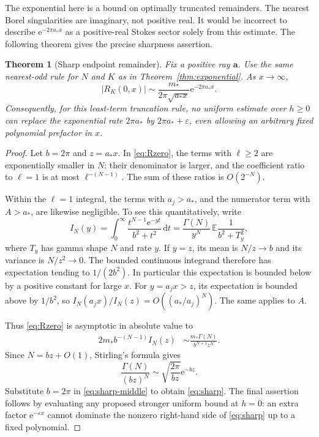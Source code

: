 \documentclass[11pt,a4paper]{article}
\numberwithin{equation}{section}
\newtheorem{theorem}{Theorem}[section]
\theoremstyle{definition}\newtheorem{definition}[theorem]{Definition}
\theoremstyle{remark}\newtheorem{remark}[theorem]{Remark}
\newcommand{\e}{\mathrm e}
\newcommand{\dd}{\,\mathrm d}
\newcommand{\avec}{\boldsymbol a}
\newcommand{\amin}{a_*}
\newcommand{\mmin}{m_*}
\begin{document}
The exponential here is a bound on optimally truncated remainders. The nearest
Borel singularities are imaginary, not positive real. It would be incorrect
to describe $\e^{-2\pi\amin x}$ as a positive-real Stokes sector solely from
this estimate. The following theorem gives the precise sharpness assertion.

\begin{theorem}[Sharp endpoint remainder]
\label{thm:sharp}
Fix a positive ray $\avec$. Use the same nearest-odd rule for $N$ and $K$ as
in Theorem~\ref{thm:exponential}. As $x\to\infty$,
\begin{equation}
 |R_K(0,x)|\sim\frac{\mmin}{2\pi\sqrt{\amin x}}
                         \e^{-2\pi\amin x}.
 \label{eq:sharp}
\end{equation}
Consequently, for this least-term truncation rule, no uniform estimate over
$h\ge0$ can replace the exponential rate $2\pi\amin$ by
$2\pi\amin+\varepsilon$, even allowing an arbitrary fixed polynomial
prefactor in $x$.
\end{theorem}
\begin{proof}
Let $b=2\pi$ and $z=\amin x$. In \eqref{eq:Rzero}, the terms with $\ell\ge2$
are exponentially smaller in $N$: their denominator is larger, and the
coefficient ratio to $\ell=1$ is at most $\ell^{-(N-1)}$. The sum of these
ratios is $O(2^{-N})$.

Within the $\ell=1$ integral, the terms with $a_j>\amin$, and the numerator
term with $A>\amin$, are likewise negligible. To see this quantitatively,
write
\begin{equation}
 I_N(y)=\int_0^\infty\frac{t^{N-1}\e^{-yt}}{b^2+t^2}\dd t
       =\frac{\Gamma(N)}{y^N}\,
            \mathbb E\frac1{b^2+T_y^2},
 \label{eq:gamma-expectation}
\end{equation}
where $T_y$ has gamma shape $N$ and rate $y$. If $y=z$, its mean is
$N/z\to b$ and its variance is $N/z^2\to0$. The bounded continuous integrand
therefore has expectation tending to $1/(2b^2)$. In particular this expectation
is bounded below by a positive constant for large $x$. For $y=a_jx>z$, its
expectation is bounded above by $1/b^2$, so
$I_N(a_jx)/I_N(z)=O((\amin/a_j)^N)$. The same applies to $A$.

Thus \eqref{eq:Rzero} is asymptotic in absolute value to
\begin{align}
 2\mmin b^{-(N-1)}I_N(z)
 &\sim\frac{\mmin\Gamma(N)}{b^{N+1}z^N}.\label{eq:sharp-middle}
\end{align}
Since $N=bz+O(1)$, Stirling's formula gives
\[
 \frac{\Gamma(N)}{(bz)^N}
     \sim\sqrt{\frac{2\pi}{bz}}\e^{-bz}.
\]
Substitute $b=2\pi$ in \eqref{eq:sharp-middle} to obtain \eqref{eq:sharp}.
The final assertion follows by evaluating any proposed stronger uniform bound
at $h=0$: an extra factor $\e^{-\varepsilon x}$ cannot dominate the nonzero
right-hand side of \eqref{eq:sharp} up to a fixed polynomial.
\end{proof}
\end{document}
